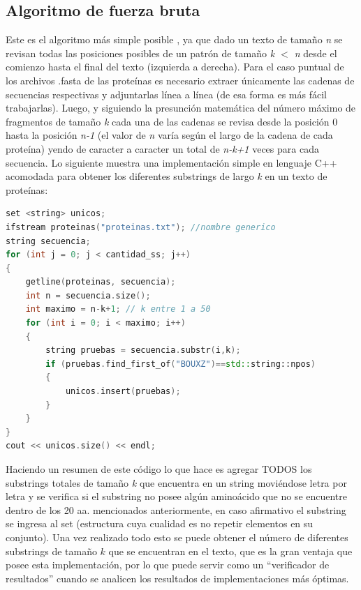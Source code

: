 \subsection{Algoritmo de fuerza bruta}

Este es el algoritmo más simple posible \cite{fuerzabruta}, ya que dado un texto de tamaño \textit{n} se revisan todas las posiciones posibles de un patrón de tamaño \textit{k $<$ n} desde el comienzo hasta el final del texto (izquierda a derecha). Para el caso puntual de los archivos .fasta de las proteínas es necesario extraer únicamente las cadenas de secuencias respectivas y adjuntarlas línea a línea (de esa forma es más fácil trabajarlas). Luego, y siguiendo la presunción matemática del número máximo de fragmentos de tamaño \textit{k} cada una de las cadenas se revisa desde la posición 0 hasta la posición \textit{n-1} (el valor de \textit{n} varía según el largo de la cadena de cada proteína) yendo de caracter a caracter un total de \textit{n-k+1} veces para cada secuencia. Lo siguiente muestra una implementación simple en lenguaje C++ acomodada para obtener los diferentes substrings de largo \textit{k} en un texto de proteínas:
\\
\begin{lstlisting}[language=C++, caption=Búsqueda utilizando fuerza bruta en C++]
set <string> unicos;
ifstream proteinas("proteinas.txt"); //nombre generico
string secuencia;
for (int j = 0; j < cantidad_ss; j++)
{
    getline(proteinas, secuencia);
    int n = secuencia.size();
    int maximo = n-k+1; // k entre 1 a 50
    for (int i = 0; i < maximo; i++)
    {
        string pruebas = secuencia.substr(i,k);
        if (pruebas.find_first_of("BOUXZ")==std::string::npos)
        {
            unicos.insert(pruebas);
        }
    }
}
cout << unicos.size() << endl;
\end{lstlisting}

Haciendo un resumen de este código lo que hace es agregar TODOS los substrings totales de tamaño \textit{k} que encuentra en un string moviéndose letra por letra y se verifica si el substring no posee algún aminoácido que no se encuentre dentro de los 20 aa. mencionados anteriormente, en caso afirmativo el substring se ingresa al set (estructura cuya cualidad es no repetir elementos en su conjunto). Una vez realizado todo esto se puede obtener el número de diferentes substrings de tamaño $k$ que se encuentran en el texto, que es la gran ventaja que posee esta implementación, por lo que puede servir como un ``verificador de resultados'' cuando se analicen los resultados de implementaciones más óptimas.

